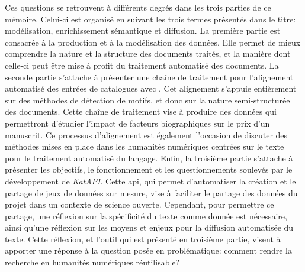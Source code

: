Ces questions se retrouvent à différents degrés dans les trois parties de ce mémoire. Celui-ci est organisé en suivant les trois termes présentés dans le titre: modélisation, enrichissement sémantique et diffusion. La première partie est consacrée à la production et à la modélisation des données. Elle permet de mieux comprendre la nature et la structure des documents traités, et la manière dont celle-ci peut être mise à profit du traitement automatisé des documents. La seconde partie s'attache à présenter une chaîne de traitement pour l'alignement automatisé des entrées de catalogues avec \wkd{}. Cet alignement s'appuie entièrement sur des méthodes de détection de motifs, et donc sur la nature semi-structurée des documents. Cette chaîne de traitement vise à produire des données qui permettront d'étudier l'impact de facteurs biographiques sur le prix d'un manuscrit. Ce processus d'alignement est également l'occasion de discuter des méthodes mises en place dans les humanités numériques centrées sur le texte pour le traitement automatisé du langage. Enfin, la troisième partie s'attache à présenter les objectifs, le fonctionnement et les questionnements soulevés par le développement de \textit{KatAPI}. Cette \gls{api}, qui permet d'automatiser la création et le partage de jeux de données sur mesure, vise à faciliter le partage des données du projet dans un contexte de science ouverte. Cependant, pour permettre ce partage, une réflexion sur la spécificité du texte comme donnée est nécessaire, ainsi qu'une réflexion sur les moyens et enjeux pour la diffusion automatisée du texte. Cette réflexion, et l'outil qui est présenté en troisième partie, visent à apporter une réponse à la question posée en problématique: comment rendre la recherche en humanités numériques réutilisable?
